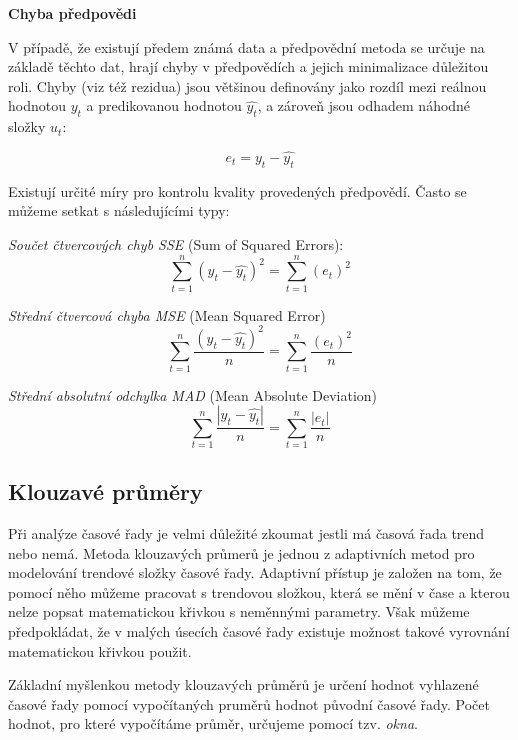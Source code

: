 \documentclass[a4paper,12pt,twoside]{scrreprt}
\begin{document}
\normalsize \textbf{Chyba předpovědi}

V případě, že existují předem známá data a předpovědní metoda se určuje na základě těchto dat, hrají chyby v předpovědích a jejich minimalizace důležitou roli. Chyby (viz též rezidua) jsou většinou definovány jako rozdíl mezi reálnou hodnotou $y_t$ a predikovanou hodnotou $\hat{y_t}$, a zároveň jsou odhadem náhodné složky $u_t$:

\begin{equation}
e_t = y_t - \hat{y_t}
\end{equation}

Existují určité míry pro kontrolu kvality provedených předpovědí. Často se můžeme setkat s následujícími typy: 

\textit{Součet čtvercových chyb SSE} (Sum of Squared Errors):
\begin{equation}
\sum_{t=1}^{n}(y_t - \hat{y_t})^2 = \sum_{t=1}^{n}(e_t)^2
\end{equation}

\textit{Střední čtvercová chyba MSE} (Mean Squared Error)
\begin{equation}
\sum_{t=1}^{n}\frac{(y_t - \hat{y_t})^2}{n} = \sum_{t=1}^{n}\frac{(e_t)^2}{n}
\end{equation}

\textit{Střední absolutní odchylka MAD} (Mean Absolute Deviation)
\begin{equation}
\sum_{t=1}^{n}\frac{|y_t - \hat{y_t}|}{n} = \sum_{t=1}^{n}\frac{|e_t|}{n}
\end{equation}

\subsection{Klouzavé průměry}

Při analýze časové řady je velmi důležité zkoumat jestli má časová řada trend nebo nemá. Metoda klouzavých průmerů je jednou z adaptivních metod pro modelování trendové složky časové řady. Adaptivní přístup je založen na tom, že pomocí něho můžeme pracovat s trendovou složkou, která se mění v čase a kterou nelze popsat matematickou křivkou s neměnnými parametry. Však můžeme předpokládat, že v malých úsecích časové řady existuje možnost takové vyrovnání matematickou křivkou použit. \cite{cipra}

Základní myšlenkou metody klouzavých průměrů je určení hodnot vyhlazené časové řady pomocí vypočítaných pruměrů hodnot původní časové řady. Počet hodnot, pro které vypočítáme průměr, určujeme pomocí tzv. \textit{okna}.   
\end{document}
